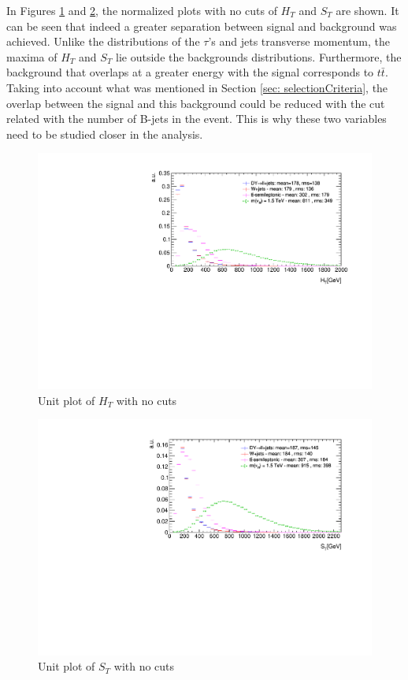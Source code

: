 In Figures \ref{fig: HTunitNC} and \ref{fig: STunitNC}, the normalized plots with no cuts of $H_{T}$ and $S_{T}$ are shown. It can be seen that indeed a greater separation between signal and background was achieved. Unlike the distributions of the $\tau$'s and jets transverse momentum, the maxima of $H_{T}$ and $S_{T}$ lie outside the backgrounds distributions. Furthermore, the background that overlaps at a greater energy with the signal corresponds to $t\bar{t}$. Taking into account what was mentioned in Section \ref{sec: selectionCriteria}, the overlap between the signal and this background could be reduced with the cut related with the number of B-jets in the event. This is why these two variables need to be studied closer in the analysis.

\begin{figure}
\includegraphics[width=\linewidth]{Plots/HT_unitNC.pdf}
\caption{Unit plot of $H_{T}$ with no cuts}
\label{fig: HTunitNC}
\end{figure}

\begin{figure}
\centering
\includegraphics[width=\linewidth]{Plots/ST_unitNC.pdf}
\caption{Unit plot of $S_{T}$ with no cuts}
\label{fig: STunitNC}
\end{figure}

